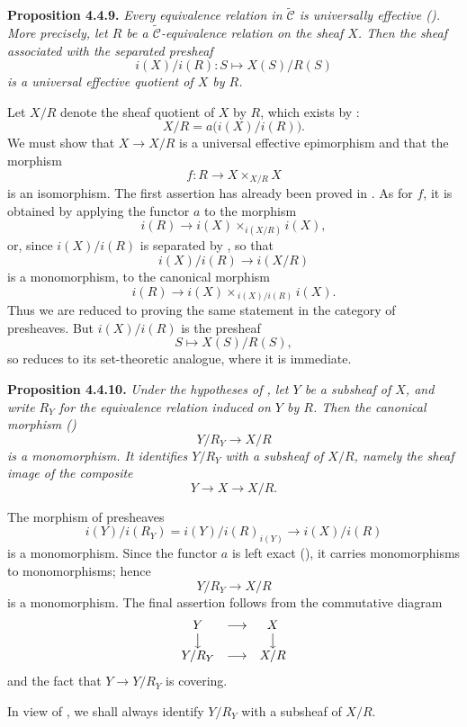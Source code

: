 

\medskip
\noindent{}\textbf{Proposition 4.4.9.}
\textit{Every equivalence relation in \(\widetilde{\mathscr C}\) is
universally effective (). More precisely, let \(R\) be a
\(\widetilde{\mathscr C}\)-equivalence relation on the sheaf \(X\). Then the
sheaf associated with the separated presheaf}
\[
  i(X)/i(R):S\longmapsto X(S)/R(S)
\]
\textit{is a universal effective quotient of \(X\) by \(R\).}

Let \(X/R\) denote the sheaf quotient of \(X\) by \(R\), which exists by
:
\[
  X/R=a\bigl(i(X)/i(R)\bigr).
\]
We must show that \(X\to X/R\) is a universal effective epimorphism and that
the morphism
\[
  f:R\longrightarrow X\times_{X/R}X
\]
is an isomorphism. The first assertion has already been proved in .
As for \(f\), it is obtained by applying the functor \(a\) to the morphism
\[
  i(R)\longrightarrow i(X)\times_{i(X/R)}i(X),
\]
or, since \(i(X)/i(R)\) is separated by , so that
\[
  i(X)/i(R)\longrightarrow i(X/R)
\]
is a monomorphism, to the canonical morphism
\[
  i(R)\longrightarrow
  i(X)\times_{\,i(X)/i(R)}i(X).
\]
Thus we are reduced to proving the same statement in the category of
presheaves. But \(i(X)/i(R)\) is the presheaf
\[
  S\longmapsto X(S)/R(S),
\]
so  reduces to its set-theoretic analogue, where it is
immediate.

\medskip
\noindent{}\textbf{Proposition 4.4.10.}
\textit{Under the hypotheses of , let \(Y\) be a subsheaf of \(X\), and
write \(R_Y\) for the equivalence relation induced on \(Y\) by \(R\). Then the
canonical morphism ()}
\[
  Y/R_Y\longrightarrow X/R
\]
\textit{is a monomorphism. It identifies \(Y/R_Y\) with a subsheaf of
\(X/R\), namely the sheaf image of the composite}
\[
  Y\longrightarrow X\longrightarrow X/R.
\]

The morphism of presheaves
\[
  i(Y)/i(R_Y)
  =i(Y)/i(R)_{i(Y)}
  \longrightarrow i(X)/i(R)
\]
is a monomorphism. Since the functor \(a\) is left exact (), it carries
monomorphisms to monomorphisms; hence
\[
  Y/R_Y\longrightarrow X/R
\]
is a monomorphism. The final assertion follows from the commutative diagram
\[
\begin{array}{ccc}
  Y&\longrightarrow&X\\
  \big\downarrow&&\big\downarrow\\
  Y/R_Y&\longrightarrow&X/R
\end{array}
\]
and the fact that \(Y\to Y/R_Y\) is covering.

In view of , we shall always identify \(Y/R_Y\) with a
subsheaf of \(X/R\).

